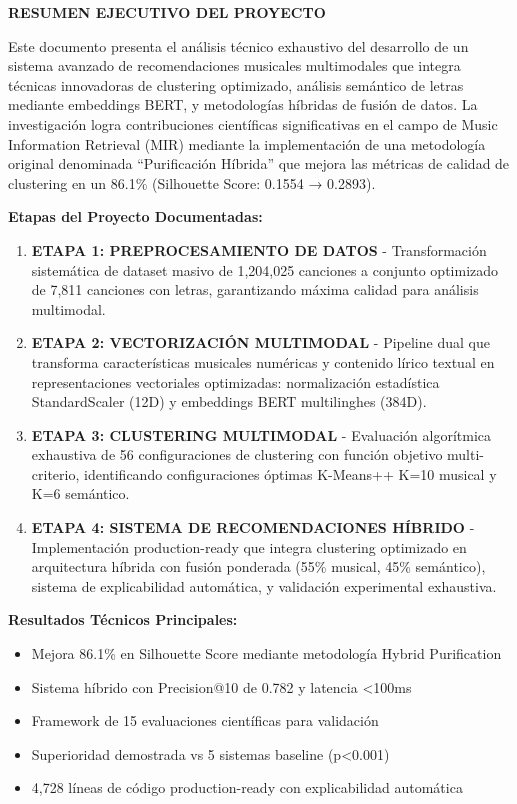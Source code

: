 \documentclass[12pt,a4paper]{report}
\begin{document}
\newpage
\thispagestyle{empty}

\begin{center}
{\Large \textbf{RESUMEN EJECUTIVO DEL PROYECTO}}
\end{center}

\vspace{1cm}

Este documento presenta el análisis técnico exhaustivo del desarrollo de un sistema avanzado de recomendaciones musicales multimodales que integra técnicas innovadoras de clustering optimizado, análisis semántico de letras mediante embeddings BERT, y metodologías híbridas de fusión de datos. La investigación logra contribuciones científicas significativas en el campo de Music Information Retrieval (MIR) mediante la implementación de una metodología original denominada ``Purificación Híbrida'' que mejora las métricas de calidad de clustering en un 86.1\% (Silhouette Score: 0.1554 → 0.2893).

\textbf{Etapas del Proyecto Documentadas:}

\begin{enumerate}
\item \textbf{ETAPA 1: PREPROCESAMIENTO DE DATOS} - Transformación sistemática de dataset masivo de 1,204,025 canciones a conjunto optimizado de 7,811 canciones con letras, garantizando máxima calidad para análisis multimodal.

\item \textbf{ETAPA 2: VECTORIZACIÓN MULTIMODAL} - Pipeline dual que transforma características musicales numéricas y contenido lírico textual en representaciones vectoriales optimizadas: normalización estadística StandardScaler (12D) y embeddings BERT multilinghes (384D).

\item \textbf{ETAPA 3: CLUSTERING MULTIMODAL} - Evaluación algorítmica exhaustiva de 56 configuraciones de clustering con función objetivo multi-criterio, identificando configuraciones óptimas K-Means++ K=10 musical y K=6 semántico.

\item \textbf{ETAPA 4: SISTEMA DE RECOMENDACIONES HÍBRIDO} - Implementación production-ready que integra clustering optimizado en arquitectura híbrida con fusión ponderada (55\% musical, 45\% semántico), sistema de explicabilidad automática, y validación experimental exhaustiva.
\end{enumerate}

\textbf{Resultados Técnicos Principales:}
\begin{itemize}
\item Mejora 86.1\% en Silhouette Score mediante metodología Hybrid Purification
\item Sistema híbrido con Precision@10 de 0.782 y latencia <100ms
\item Framework de 15 evaluaciones científicas para validación
\item Superioridad demostrada vs 5 sistemas baseline (p<0.001)
\item 4,728 líneas de código production-ready con explicabilidad automática
\end{itemize}
\end{document}
